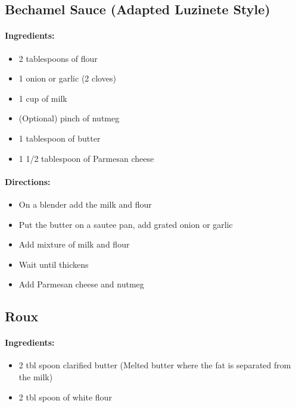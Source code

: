 \documentclass{article}
\begin{document}
\subsection{Bechamel Sauce (Adapted Luzinete Style)}

\paragraph{Ingredients:}

\begin{itemize}
	\item 2 tablespoons of flour
	\item 1 onion or garlic (2 cloves)
	\item 1 cup of milk
	\item (Optional) pinch of nutmeg
	\item 1 tablespoon of butter
	\item 1 1/2 tablespoon of Parmesan cheese
\end{itemize}

\paragraph{Directions:}
\begin{itemize}
	\item On a blender add the milk and flour
	\item Put the butter on a sautee pan, add grated onion or garlic
	\item Add mixture of milk and flour
	\item Wait until thickens
	\item Add Parmesan cheese and nutmeg
\end{itemize}

\subsection{Roux}

\paragraph{Ingredients:}

\begin{itemize}
	\item 2 tbl spoon clarified butter (Melted butter where the fat is separated from the milk)
	\item 2 tbl spoon of white flour
\end{itemize}
\end{document}
